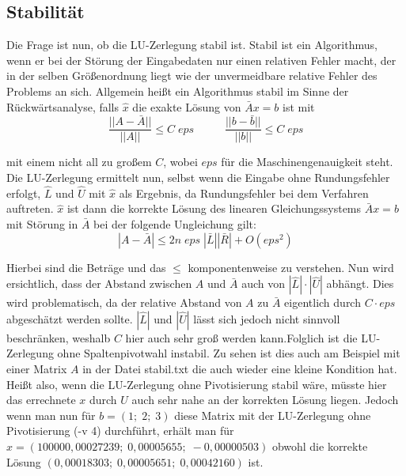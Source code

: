 \documentclass[course=erap]{aspdoc}
\begin{document}
\subsection{Stabilität}
Die Frage ist nun, ob die LU-Zerlegung stabil ist.
Stabil ist ein Algorithmus, wenn er bei der Störung der Eingabedaten nur einen relativen Fehler macht, 
der in der selben Größenordnung liegt wie der unvermeidbare relative Fehler des Problems an sich. 
Allgemein heißt ein Algorithmus stabil im Sinne der Rückwärtsanalyse, 
falls $\hat{x}$ die exakte Lösung von $\bar{A}x = b$ ist mit 	
  \begin{equation}
    \label{norm}
    \frac{|| A - \bar{A}||}{||A||} \leq C \; eps \;\; \;\;\;\;\;\;\;\;  \frac{|| b - \bar{b}||}{||b||} \leq C \; eps
  \end{equation}

mit einem nicht all zu großem $C$, wobei $eps$ für die Maschinengenauigkeit steht.
Die LU-Zerlegung ermittelt nun, selbst wenn die Eingabe ohne Rundungsfehler erfolgt, $\hat{L}$ und $\hat{U}$ mit 
$\hat{x}$ als Ergebnis, da Rundungsfehler bei dem Verfahren auftreten. $\hat{x}$ ist dann die 
korrekte Lösung des linearen Gleichungssystems $\bar{A}x=b$ mit Störung in $\bar{A}$ bei der folgende Ungleichung gilt:
  \begin{equation}
    \label{eg3}
    |A - \bar{A}| \leq 2n \; eps \; |\bar{L}||\bar{R}| + O(eps^2)
  \end{equation}

Hierbei sind die Beträge und das $\leq$ komponentenweise zu verstehen.								
Nun wird ersichtlich, dass der Abstand zwischen $A$ und $\bar{A}$ auch von $|\hat{L}| \cdot |\hat{U}|$
abhängt. Dies wird problematisch, da der relative Abstand von $A$ zu $\bar{A}$ eigentlich durch 
$C\cdot eps$ abgeschätzt werden sollte. $|\hat{L}|$ und $|\hat{U}|$ lässt sich jedoch nicht sinnvoll 
beschränken, weshalb $C$ hier auch sehr groß werden kann.Folglich ist die LU-Zerlegung ohne Spaltenpivotwahl instabil\cite[75-79]{M2008}.
Zu sehen ist dies auch am Beispiel mit einer Matrix $A$ in der Datei stabil.txt die auch wieder eine kleine Kondition hat. 
Heißt also, wenn die LU-Zerlegung ohne Pivotisierung stabil wäre, müsste hier das errechnete $x$ durch $U$ auch sehr nahe 
an der korrekten Lösung liegen. Jedoch wenn man nun für $b = (1;\; 2;\; 3)$ diese Matrix mit der LU-Zerlegung ohne Pivotisierung (-v 4) 
durchführt, erhält man für $x = (100000,00027239;\; 0,00005655;\; -0,00000503)$ obwohl die korrekte Lösung 
$(0,00018303;\; 0,00005651;\; 0,00042160)$ ist. \\
\end{document}
